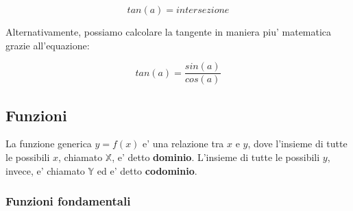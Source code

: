 \documentclass{article}
\begin{document}
{{    $$ tan(a) = intersezione $$

    \usetikzlibrary{angles,quotes}
    \newcommand\Base[1][0]{
      \begin{scope}[xshift=#1]
        \clip
          (-0.5,5.5) rectangle (5.5,-0.5);
          \draw[->]
          (-0.5,0) -- (5,0) node[right] {$x$};
        \draw[->]
          (0,-0.5) -- (0,5) node[above] {$y$};
        \coordinate (O) at (0,0);
        \coordinate (aux1) at (40:4);
        \coordinate (aux2) at (aux1|-0,0);
        \coordinate (aux3) at (4,{4*tan(40)});
        \draw
          (O) -- (aux3) -- (aux3|-0,0)
          (aux1) -- (aux2);
        \draw[thick,red!70!black] 
          (O) circle (4);
        \pic[draw,"$a$",angle radius=30pt,angle eccentricity=1.2] {angle = aux2--O--aux1};   
      \end{scope}  
    }


    Alternativamente, possiamo calcolare la tangente in maniera piu' matematica grazie all'equazione:

    $$ tan(a) = \frac{sin(a)}{cos(a)} $$

    \pagebreak

    \subsection{Funzioni}
    La funzione generica $ y = f(x) $ e' una relazione tra $ x $ e $ y $, dove l'insieme di tutte le possibili $ x $, chiamato $ \mathbb{X} $, e' detto \textbf{dominio}. L'insieme di tutte le possibili $ y $, invece, e' chiamato $ \mathbb{Y} $ ed e' detto \textbf{codominio}.

    \subsubsection{Funzioni fondamentali} %
    }}
\end{document}
